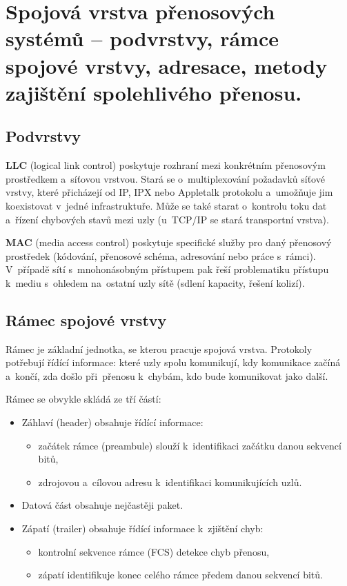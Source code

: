 \clearpage
\section{Spojová vrstva přenosových systémů -- podvrstvy, rámce spojové vrstvy, adresace, metody zajištění spolehlivého přenosu.}

\subsection{Podvrstvy}

\textbf{LLC} (logical link control) poskytuje rozhraní mezi konkrétním přenosovým prostředkem a~síťovou vrstvou. Stará se o~multiplexování požadavků síťové vrstvy, které přicházejí od IP, IPX nebo Appletalk protokolu a~umožňuje jim koexistovat v~jedné infrastruktuře. Může se také starat o~kontrolu toku dat a~řízení chybových stavů mezi uzly (u~TCP/IP se stará transportní vrstva).

\textbf{MAC} (media access control) poskytuje specifické služby pro daný přenosový prostředek (kódování, přenosové schéma, adresování nebo práce s~rámci). V~případě sítí s~mnohonásobným přístupem pak řeší problematiku přístupu k~mediu s~ohledem na~ostatní uzly sítě (sdlení kapacity, řešení kolizí).

\subsection{Rámec spojové vrstvy}

Rámec je základní jednotka, se kterou pracuje spojová vrstva. Protokoly potřebují řídící informace: které uzly spolu komunikují, kdy komunikace začíná a~končí, zda došlo při~přenosu k~chybám, kdo bude komunikovat jako další.

Rámec se obvykle skládá ze tří částí:
\begin{itemize}[noitemsep]
    \item Záhlaví (header) obsahuje řídící informace:
    \begin{itemize}[noitemsep]
        \item začátek rámce (preambule) slouží k~identifikaci začátku danou sekvencí bitů,
        \item zdrojovou a~cílovou adresu k~identifikaci komunikujících uzlů.
    \end{itemize}
    \item Datová část obsahuje nejčastěji paket.
    \item Zápatí (trailer) obsahuje řídící informace k~zjištění chyb:
    \begin{itemize}[noitemsep]
        \item kontrolní sekvence rámce (FCS) detekce chyb přenosu,
        \item zápatí identifikuje konec celého rámce předem danou sekvencí bitů.
    \end{itemize}
\end{itemize}


